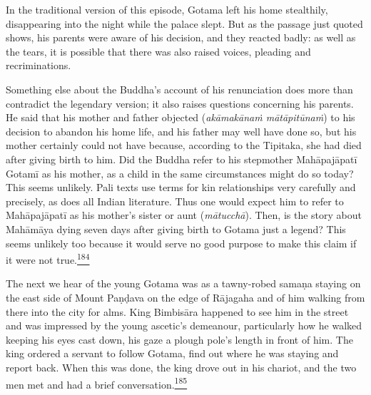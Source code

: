 In the traditional version of this episode, Gotama left his home
stealthily, disappearing into the night while the palace slept. But as
the passage just quoted shows, his parents were aware of his decision,
and they reacted badly: as well as the tears, it is possible that there
was also raised voices, pleading and recriminations.

Something else about the Buddha's account of his renunciation does more
than contradict the legendary version; it also raises questions
concerning his parents. He said that his mother and father objected
(\emph{akāmakānaṁ mātāpitūnaṁ}) to his decision to abandon his home
life, and his father may well have done so, but his mother certainly
could not have because, according to the Tipitaka, she had died after
giving birth to him. Did the Buddha refer to his stepmother Mahāpajāpatī
Gotamī as his mother, as a child in the same circumstances might do so
today? This seems unlikely. Pali texts use terms for kin relationships
very carefully and precisely, as does all Indian literature. Thus one
would expect him to refer to Mahāpajāpatī as his mother's sister or aunt
(\emph{mātucchā}). Then, is the story about Mahāmāya dying seven days
after giving birth to Gotama just a legend? This seems unlikely too
because it would serve no good purpose to make this claim if it were not
true.\label{footprints_split_009.html_fnref184}\hyperref[footprints_split_024.htmlux5cux23fn184]{\textsuperscript{184}}

The next we hear of the young Gotama was as a tawny-robed samaṇa staying
on the east side of Mount Paṇḍava on the edge of Rājagaha and of him
walking from there into the city for alms. King Bimbisāra happened to
see him in the street and was impressed by the young ascetic's
demeanour, particularly how he walked keeping his eyes cast down, his
gaze a plough pole's length in front of him. The king ordered a servant
to follow Gotama, find out where he was staying and report back. When
this was done, the king drove out in his chariot, and the two men met
and had a brief
conversation.\label{footprints_split_009.html_fnref185}\hyperref[footprints_split_024.htmlux5cux23fn185]{\textsuperscript{185}}

